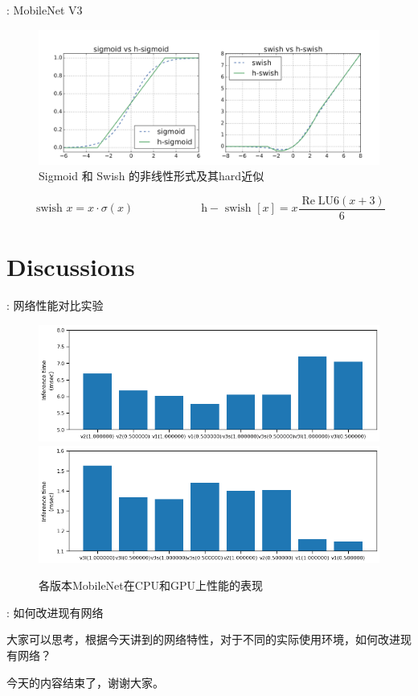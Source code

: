 \begin{frame}{\titleprefix: MobileNet V3}
	\begin{figure}
		\centering
		\includegraphics[width=0.9\linewidth]{Images/mobilenetv3}
		\caption{Sigmoid 和 Swish 的非线性形式及其hard近似}
		\label{fig:mobilenetv3}
	\end{figure}
	\[\text { swish } x=x \cdot \sigma(x)
	\hspace{1in}
	 \mathrm{h}-\text { swish }[x]=x
 \frac{\operatorname{Re} \mathrm{L} \mathrm{U} 6(x+3)}{6}\]
\end{frame}

\section{Discussions}

\begin{frame}{\titleprefix: 网络性能对比实验}
	\begin{figure}
		\centering
		\includegraphics[width=0.7\linewidth]{Images/mobilenetcomp}
		\includegraphics[width=0.7\linewidth]{Images/mobilenetcompgpu}
		\caption{各版本MobileNet在CPU和GPU上性能的表现}
		\label{fig:mobilenetcomp}
	\end{figure}

\end{frame}

\begin{frame}{\titleprefix: 如何改进现有网络}

		大家可以思考，根据今天讲到的网络特性，对于不同的实际使用环境，如何改进现有网络？

\end{frame}

\begin{frame}
	今天的内容结束了，谢谢大家。
\end{frame}
